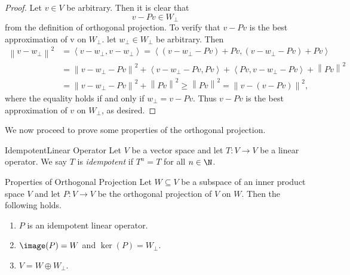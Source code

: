 \documentclass[linearalgebraII]{subfiles}
\begin{document}
    \begin{proof}
        Let $v\in V$ be arbitrary. Then it is clear that
        \begin{equation*}
            v - Pv \in W_\perp 
        \end{equation*}
        from the definition of orthogonal projection. To verify that $v-Pv$ is the best approximation of v on $W_\perp$. let $w_\perp\in W_\perp$ be arbitrary. Then
        \begin{align*}
            \left\lVert v-w_\perp\right\rVert ^2 & = \left\langle v-w_\perp, v-w_\perp\right\rangle = \left\langle \left( v-w_\perp-Pv \right) + Pv, \left( v-w_\perp-Pv \right) + Pv\right\rangle \\
                                                 & = \left\lVert v-w_\perp-Pv\right\rVert ^2 + \left\langle v-w_\perp-Pv, Pv\right\rangle + \left\langle Pv, v-w_\perp-Pv\right\rangle + \left\lVert Pv\right\rVert ^2 \\
                                                 & = \left\lVert v-w_\perp-Pv\right\rVert ^2 + \left\lVert Pv\right\rVert ^2 \geq \left\lVert Pv\right\rVert ^2 = \left\lVert v-\left( v-Pv \right) \right\rVert ^2,
        \end{align*} 
        where the equality holds if and only if $w_\perp = v - Pv$. Thus $v-Pv$ is the best approximation of $v$ on $W_\perp$, as desired.
    \end{proof}

    \begin{remark}
        We now proceed to prove some properties of the orthogonal projection.
    \end{remark}

    \begin{definition}{Idempotent}{Linear Operator}
        Let $V$ be a vector space and let $T:V\to V$ be a linear operator. We say $T$ is \emph{idempotent} if $T^n=T$ for all $n\in\N$.
    \end{definition}

    \begin{prop}{Properties of Orthogonal Projection}
        Let $W\subseteq V$ be a subspace of an inner product space $V$ and let $P:V\to V$ be the orthogonal projection of $V$ on $W$. Then the following holds.
        \begin{enumerate}
            \item $P$ is an idempotent linear operator.
            \item $\image(P) = W$ and $\ker(P) = W_\perp$.
            \item $V = W\oplus W_\perp$.
        \end{enumerate}
    \end{prop}
\end{document}
